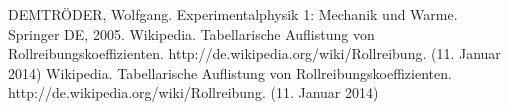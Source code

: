 \pagebreak
\begin{thebibliography}{9}
 DEMTRÖDER, Wolfgang. Experimentalphysik 1: Mechanik und Warme. Springer DE, 2005.
 Wikipedia. Tabellarische Auflistung von Rollreibungskoeffizienten. http://de.wikipedia.org/wiki/Rollreibung. (11. Januar 2014)
 Wikipedia. Tabellarische Auflistung von Rollreibungskoeffizienten. http://de.wikipedia.org/wiki/Rollreibung. (11. Januar 2014)
\end{thebibliography}

